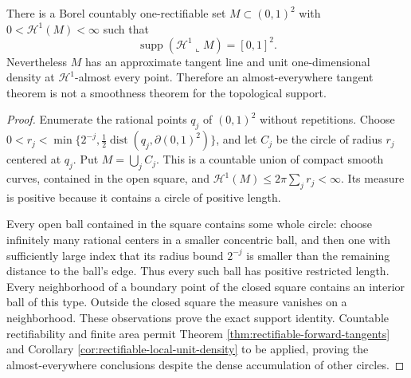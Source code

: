 \begin{example}\label{ex:dense-circle-rectifiable-support}
There is a Borel countably one-rectifiable set $M\subset(0,1)^2$ with $0<\mathcal H^1(M)<\infty$ such that
\[
 \operatorname{supp}(\mathcal H^1\llcorner M)=[0,1]^2.
\]
Nevertheless $M$ has an approximate tangent line and unit one-dimensional density at $\mathcal H^1$-almost every point. Therefore an almost-everywhere tangent theorem is not a smoothness theorem for the topological support.
\end{example}
\begin{proof}
Enumerate the rational points $q_j$ of $(0,1)^2$ without repetitions. Choose $0<r_j<\min\{2^{-j},\tfrac12\operatorname{dist}(q_j,\partial(0,1)^2)\}$, and let $C_j$ be the circle of radius $r_j$ centered at $q_j$. Put $M=\bigcup_jC_j$. This is a countable union of compact smooth curves, contained in the open square, and $\mathcal H^1(M)\leq2\pi\sum_jr_j<\infty$. Its measure is positive because it contains a circle of positive length.

Every open ball contained in the square contains some whole circle: choose infinitely many rational centers in a smaller concentric ball, and then one with sufficiently large index that its radius bound $2^{-j}$ is smaller than the remaining distance to the ball's edge. Thus every such ball has positive restricted length. Every neighborhood of a boundary point of the closed square contains an interior ball of this type. Outside the closed square the measure vanishes on a neighborhood. These observations prove the exact support identity. Countable rectifiability and finite area permit Theorem \ref{thm:rectifiable-forward-tangents} and Corollary \ref{cor:rectifiable-local-unit-density} to be applied, proving the almost-everywhere conclusions despite the dense accumulation of other circles.
\end{proof}

